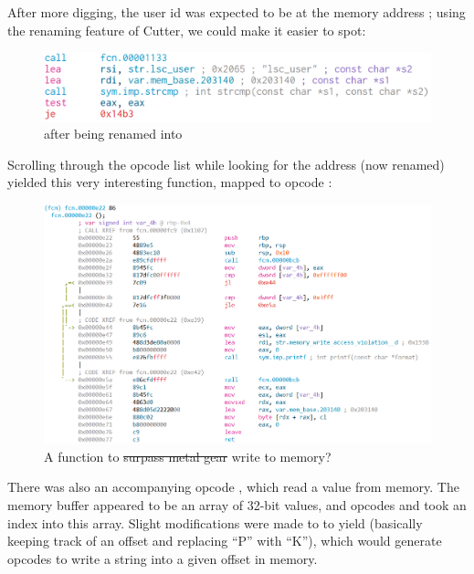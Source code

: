 		\pagebreak
		After more digging, the user id was expected to be at the memory address ; using the renaming feature of Cutter, we could
		make it easier to spot:

		\begin{figure}[!htbp]\centering
			\includegraphics[width=150mm]{figures/lscvm-ii/addr-after-rename.png} \vspace{5mm}
			\caption{\ttt{[0x203140]} after being renamed into }
		\end{figure}

		Scrolling through the opcode list while looking for the address (now renamed) yielded this very interesting function, mapped to opcode
		:

		\begin{figure}[!htbp]\centering
			\includegraphics[width=150mm]{figures/lscvm-ii/write-to-memory.png} \vspace{5mm}
			\caption{A function to \sout{surpass metal gear} write to memory?}
		\end{figure}

		There was also an accompanying opcode , which read a value from memory. The memory buffer appeared to be an array of 32-bit
		values, and opcodes  and  took an index into this array. Slight modifications were made to 
		to yield  (basically keeping track of an offset and replacing \enquote{P} with \enquote{K}), which would
		generate opcodes to write a string into a given offset in memory.

